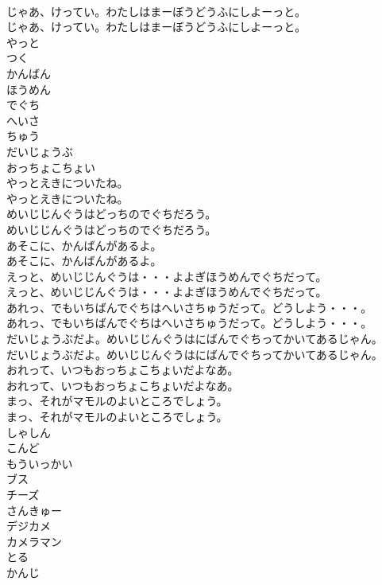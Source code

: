 \documentclass[8pt]{extreport}
\begin{document}
\begin{CJK}{UTF8}{min}
\\	じゃあ、けってい。わたしはまーぼうどうふにしよーっと。	
\\	じゃあ、けってい。わたしはまーぼうどうふにしよーっと。 
\\	やっと
\\	つく
\\	かんばん
\\	ほうめん
\\	でぐち
\\	へいさ
\\	ちゅう
\\	だいじょうぶ
\\	おっちょこちょい
\\	やっとえきについたね。	
\\	やっとえきについたね。 
\\	めいじじんぐうはどっちのでぐちだろう。	
\\	めいじじんぐうはどっちのでぐちだろう。 
\\	あそこに、かんばんがあるよ。	
\\	あそこに、かんばんがあるよ。 
\\	えっと、めいじじんぐうは・・・よよぎほうめんでぐちだって。	
\\	えっと、めいじじんぐうは・・・よよぎほうめんでぐちだって。 
\\	あれっ、でもいちばんでぐちはへいさちゅうだって。どうしよう・・・。	
\\	あれっ、でもいちばんでぐちはへいさちゅうだって。どうしよう・・・。 
\\	だいじょうぶだよ。めいじじんぐうはにばんでぐちってかいてあるじゃん。	
\\	だいじょうぶだよ。めいじじんぐうはにばんでぐちってかいてあるじゃん。 
\\	おれって、いつもおっちょこちょいだよなあ。	
\\	おれって、いつもおっちょこちょいだよなあ。 
\\	まっ、それがマモルのよいところでしょう。	
\\	まっ、それがマモルのよいところでしょう。 
\\	しゃしん
\\	こんど
\\	もういっかい
\\	ブス
\\	チーズ
\\	さんきゅー
\\	デジカメ
\\	カメラマン
\\	とる
\\	かんじ

\end{CJK}
\end{document}
